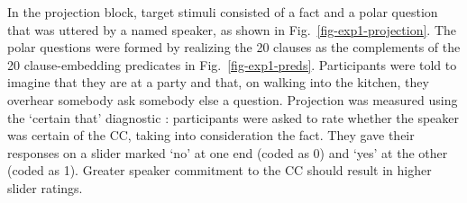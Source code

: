 \documentclass[11pt,fleqn]{article}
\newcommand{\6}{\mbox{$[\hspace*{-.6mm}[$}}
\newcommand{\9}{\mbox{$]\hspace*{-.6mm}]$}}
\begin{document}
In the projection block, target stimuli consisted of a fact and a polar question that was uttered by a named speaker, as shown in Fig.~\ref{fig-exp1-projection}. The polar questions were formed by realizing the 20 clauses as the complements of the 20 clause-embedding predicates in Fig.~\ref{fig-exp1-preds}. Participants were told to imagine that they are at a party and that, on walking into the kitchen, they overhear somebody ask somebody else a question. Projection was measured using the `certain that' diagnostic \cite{djaerv-bacovcin-salt27,tbd-variability, lorson2018, mahler2020}: participants were asked to rate whether the speaker was certain of the CC, taking into consideration the fact. They gave their responses on a slider marked `no' at one end (coded as 0) and `yes' at the other (coded as 1). Greater speaker commitment to the CC should result in higher slider ratings.
\end{document}
